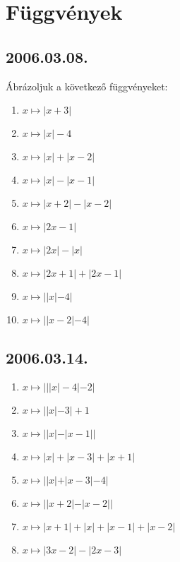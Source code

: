 \documentclass{article}
\begin{document}
\section*{Függvények}

\subsection*{2006.03.08.}
Ábrázoljuk a következő függvényeket:
\begin{enumerate}
\item $x \mapsto |x+3|$
\item $x \mapsto |x|-4$
\item $x \mapsto |x|+|x-2|$
\item $x \mapsto |x|-|x-1|$
\item $x \mapsto |x+2|-|x-2|$
\item $x \mapsto |2x-1|$
\item $x \mapsto |2x|-|x|$
\item $x \mapsto |2x+1|+|2x-1|$
\item $x \mapsto ||x|-4|$
\item $x \mapsto ||x-2|-4|$
\end{enumerate}

\subsection*{2006.03.14.}
\begin{enumerate}
\item $x \mapsto |||x|-4|-2|$
\item $x \mapsto||x|-3|+1$
\item $x \mapsto ||x|-|x-1||$
\item $x \mapsto |x|+|x-3|+|x+1|$
\item $x \mapsto ||x|+|x-3|-4|$
\item $x \mapsto ||x+2|-|x-2||$
\item $x \mapsto |x+1|+|x|+|x-1|+|x-2|$
\item $x \mapsto |3x-2|-|2x-3|$
\end{enumerate}
\end{document}
